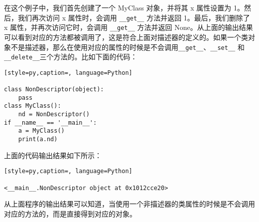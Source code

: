在这个例子中，我们首先创建了一个 MyClass 对象，并将其 x 属性设置为 1。然后，我们再次访问 x 属性时，会调用 \verb|__get__| 方法并返回 1。最后，我们删除了 x 属性，并再次访问它时，会调用 \verb|__get__| 方法并返回 None。从上面的输出结果可以看到对应的方法都被调用了，这是符合上面对描述器的定义的。如果一个类对象不是描述器，那么在使用对应的属性的时候是不会调用\verb|__get__|、\verb|__set__| 和 \verb|__delete__|三个方法的。比如下面的代码：
\begin{lstlisting}[style=py,caption=, language=Python]

class NonDescriptor(object):
    pass
class MyClass():
    nd = NonDescriptor()
if __name__ == '__main__':
    a = MyClass()
    print(a.nd)
\end{lstlisting}
上面的代码输出结果如下所示：
\begin{lstlisting}[style=py,caption=, language=Python]

<__main__.NonDescriptor object at 0x1012cce20>
\end{lstlisting}
从上面程序的输出结果可以知道，当使用一个非描述器的类属性的时候是不会调用对应的方法的，而是直接得到对应的对象。
